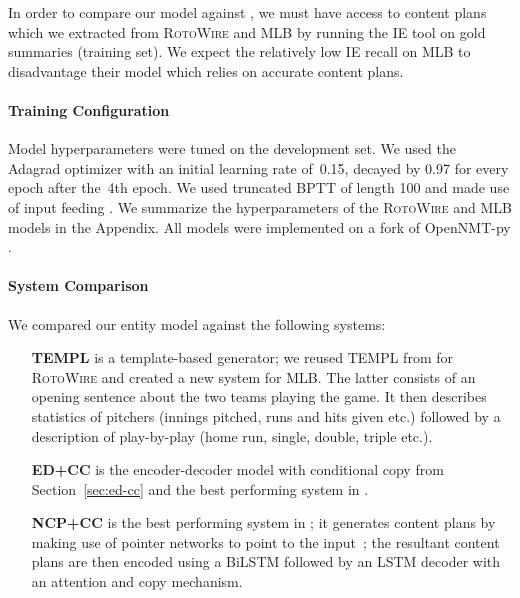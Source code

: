 \documentclass[11pt,a4paper]{article}
\begin{document}
In order to compare our model against
, we must have access to
content plans which we extracted from \textsc{RotoWire} and MLB by
running the IE tool on gold summaries (training set). We expect the
relatively low IE recall on MLB to disadvantage their model which
relies on accurate content plans.


\paragraph{Training Configuration}
Model hyperparameters were tuned on the development set.  We used the
Adagrad optimizer \cite{DBLP:journals/jmlr/DuchiHS11} with an initial
learning rate of~0.15, decayed by 0.97 for every epoch after the~4th
epoch.  We used truncated BPTT \cite{DBLP:journals/neco/WilliamsP90}
of length 100 and made use of input feeding \cite{D15-1166}.  We
summarize the hyperparameters of the \textsc{RotoWire} and MLB models
in the Appendix. All models were implemented on a fork of OpenNMT-py
\cite{P17-4012}.


\paragraph{System Comparison}
We compared our entity model against the following systems:

\begin{itemize}

\item[\textbf{TEMPL}] is a template-based generator; we reused TEMPL
  from \citet{D17-1239} for \textsc{RotoWire} and created
  a new system for MLB. The latter consists of an opening sentence
  about the two teams playing the game. It then describes statistics
  of pitchers (innings pitched, runs and hits given etc.)  followed by
  a description of play-by-play (home run, single, double, triple
  etc.). 

\item[\textbf{ED+CC}] is the encoder-decoder model with conditional
  copy from Section~\ref{sec:ed-cc} and the best performing
  system in \citet{D17-1239}.

\item[\textbf{NCP+CC}] is the best performing system in
  \citet{DBLP:journals/corr/abs-1809-00582}; it generates content
  plans by making use of pointer networks \cite{NIPS2015_5866} to
  point to the input~; the resultant content plans are then
  encoded using a BiLSTM followed by an LSTM decoder with an attention
  and copy mechanism.

\end{itemize} 
\end{document}
